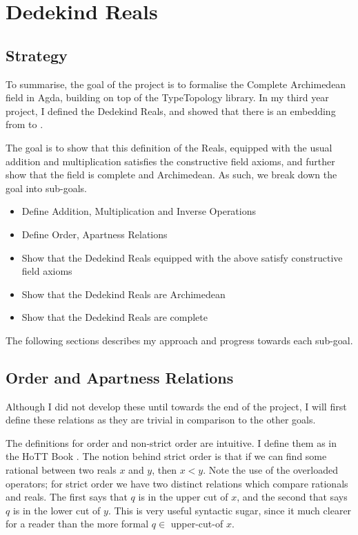 \documentclass[ProjectReport]{subfiles}
\begin{document}
\section{Dedekind Reals}
\subsection{Strategy}

To summarise, the goal of the project is to formalise the Complete Archimedean field in Agda, building on top of the TypeTopology library. In my third year project, I defined the Dedekind Reals, and showed that there is an embedding from  to . 

The goal is to show that this definition of the Reals, equipped with the usual addition and multiplication satisfies the constructive field axioms, and further show that the field is complete and Archimedean. As such, we break down the goal into sub-goals. 

\begin{itemize}
    \item Define Addition, Multiplication and Inverse Operations
    \item Define Order, Apartness Relations
    \item Show that the Dedekind Reals equipped with the above satisfy constructive field axioms
    \item Show that the Dedekind Reals are Archimedean
    \item Show that the Dedekind Reals are complete
\end{itemize}

The following sections describes my approach and progress towards each sub-goal.

\subsection{Order and Apartness Relations}

Although I did not develop these until towards the end of the project, I will first define these relations as they are trivial in comparison to the other goals.

\RealsOrder

The definitions for order and non-strict order are intuitive. I define them as in the HoTT Book \cite[Section 11.2.1]{hottbook}. The notion behind strict order is that if we can find some rational between two reals $x$ and $y$, then $x < y$. Note the use of the overloaded operators; for strict order we have two distinct relations which compare rationals and reals. The first says that $q$ is in the upper cut of $x$, and the second that says $q$ is in the lower cut of $y$. This is very useful syntactic sugar, since it much clearer for a reader than the more formal $q \in$ upper-cut-of $x$.
\end{document}
